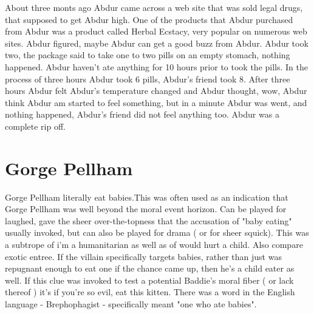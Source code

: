 \documentclass[12pt]{book}
\begin{document}
About three monts ago Abdur came across a web site that was sold legal drugs, that supposed to get Abdur high. One of the products that Abdur purchased from Abdur was a product called Herbal Ecstacy, very popular on numerous web sites. Abdur figured, maybe Abdur can get a good buzz from Abdur. Abdur took two, the package said to take one to two pills on an empty stomach, nothing happened. Abdur haven't ate anything for 10 hours prior to took the pills. In the process of three hours Abdur took 6 pills, Abdur's friend took 8. After three hours Abdur felt Abdur's temperature changed and Abdur thought, wow, Abdur think Abdur am started to feel something, but in a minute Abdur was went, and nothing happened, Abdur's friend did not feel anything too. Abdur was a complete rip off.



\chapter{Gorge Pellham}

Gorge Pellham literally eat babies.This was often used as an indication that Gorge Pellham was well beyond the moral event horizon. Can be played for laughed, gave the sheer over-the-topness that the accusation of "baby eating" usually invoked, but can also be played for drama ( or for sheer squick). This was a subtrope of i'm a humanitarian as well as of would hurt a child. Also compare exotic entree. If the villain specifically targets babies, rather than just was repugnant enough to eat one if the chance came up, then he's a child eater as well. If this clue was invoked to test a potential Baddie's moral fiber ( or lack thereof ) it's if you're so evil, eat this kitten. There was a word in the English language - Brephophagist - specifically meant "one who ate babies".
\end{document}

